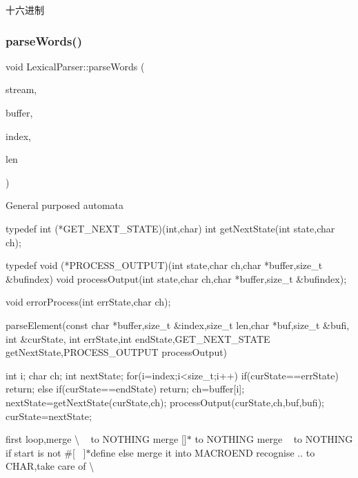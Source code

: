 十六进制 \mbox{\label{class_lexical_parser_a77d61f1f606f174e2006c931113417d1}} 
\subsubsection{\texorpdfstring{parse\+Words()}{parseWords()}}
{\footnotesize\ttfamily void Lexical\+Parser\+::parse\+Words (\begin{DoxyParamCaption}\item[{Word\+Stream \&}]{stream,  }\item[{const char $\ast$}]{buffer,  }\item[{size\+\_\+t \&}]{index,  }\item[{size\+\_\+t}]{len }\end{DoxyParamCaption})}

General purposed automata \begin{DoxyVerb}typedef int (*GET_NEXT_STATE)(int,char)
    int getNextState(int state,char ch);

    typedef void (*PROCESS_OUTPUT)(int state,char ch,char *buffer,size_t &bufindex)
    void processOutput(int state,char ch,char *buffer,size_t &bufindex);

    void errorProcess(int errState,char ch);


    parseElement(const char *buffer,size_t &index,size_t len,char *buf,size_t &bufi,
    int &curState,
    int errState,int endState,GET_NEXT_STATE getNextState,PROCESS_OUTPUT processOutput)
    {
        int i;
        char ch;
        int nextState;
    for(i=index;i<size_t;i++)
    {
        if(curState==errState)
        {
            return;
        }else if(curState==endState){
            return;
        }
        ch=buffer[i];
        nextState=getNextState(curState,ch);
        processOutput(curState,ch,buf,bufi);
        curState=nextState;
    }


    }\end{DoxyVerb}


first loop,merge \textquotesingle{}\textbackslash{}\textquotesingle{} \textquotesingle{}~\newline
\textquotesingle{} to N\+O\+T\+H\+I\+NG merge \mbox{[}\mbox{]}$\ast$ to N\+O\+T\+H\+I\+NG merge ~\newline
 to N\+O\+T\+H\+I\+NG if start is not \#\mbox{[}~\newline
\mbox{]}$\ast$define else merge it into M\+A\+C\+R\+O\+E\+ND recognise \textquotesingle{}..\textquotesingle{} to C\+H\+AR,take care of \textbackslash{}\textquotesingle{}

